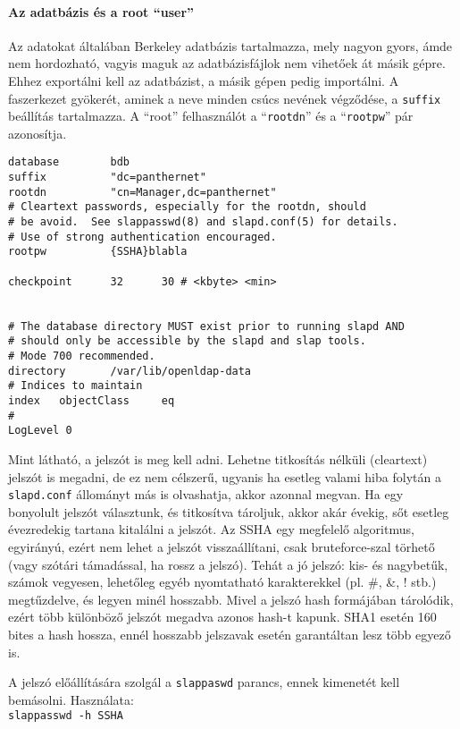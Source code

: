\paragraph{Az adatbázis és a root ``user''} Az adatokat általában Berkeley adatbázis tartalmazza, mely nagyon
gyors, ámde nem hordozható, vagyis maguk az adatbázisfájlok nem vihetőek át másik gépre. Ehhez exportálni kell az
adatbázist, a másik gépen pedig importálni. A faszerkezet gyökerét, aminek a neve minden csúcs nevének végződése, a
\texttt{suffix} beállítás tartalmazza. A ``root'' felhasználót a ``\texttt{rootdn}'' és a ``\texttt{rootpw}'' pár
azonosítja.

\begin{Verbatim}[frame=single]
database        bdb
suffix          "dc=panthernet"
rootdn          "cn=Manager,dc=panthernet"
# Cleartext passwords, especially for the rootdn, should
# be avoid.  See slappasswd(8) and slapd.conf(5) for details.
# Use of strong authentication encouraged.
rootpw          {SSHA}blabla

checkpoint      32      30 # <kbyte> <min>


# The database directory MUST exist prior to running slapd AND
# should only be accessible by the slapd and slap tools.
# Mode 700 recommended.
directory       /var/lib/openldap-data
# Indices to maintain
index   objectClass     eq
#
LogLevel 0
\end{Verbatim}


Mint látható, a jelszót is meg kell adni. Lehetne titkosítás nélküli (cleartext) jelszót is megadni, de ez nem
célszerű, ugyanis ha esetleg valami hiba folytán a \texttt{slapd.conf} állományt más is olvashatja, akkor azonnal
megvan. Ha egy bonyolult jelszót választunk, és titkosítva tároljuk, akkor akár évekig, sőt esetleg évezredekig
tartana kitalálni a jelszót. Az \textsc{SSHA} egy megfelelő algoritmus, egyirányú, ezért
nem lehet a jelszót visszaállítani, csak bruteforce-szal törhető (vagy szótári támadással, ha rossz a jelszó). Tehát a
jó jelszó: kis-  és nagybetűk, számok vegyesen, lehetőleg egyéb nyomtatható karakterekkel (pl. \#, \&, ! stb.)
megtűzdelve, és legyen minél hosszabb. Mivel a jelszó hash formájában tárolódik, ezért több különböző jelszót megadva
azonos hash-t kapunk. \textsc{SHA1} esetén 160 bites a hash hossza, ennél hosszabb jelszavak esetén garantáltan lesz több
egyező is.


A jelszó előállítására szolgál a \texttt{slappaswd} parancs, ennek kimenetét kell bemásolni. Használata:\\
\texttt{slappasswd -h {SSHA}}


